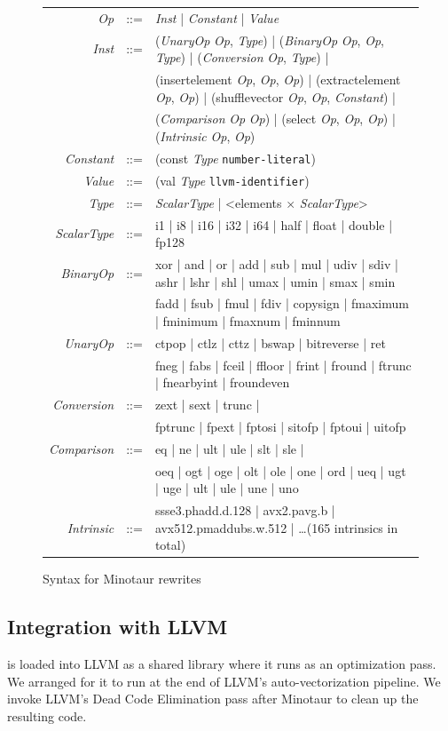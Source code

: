 \begin{figure}[tbp]
  \begin{tabular}{r c l}
    \emph{Op} &::=& \emph{Inst} | \emph{Constant} | \emph{Value} \\
    \emph{Inst}  &::=& (\emph{UnaryOp} \emph{Op}, \emph{Type}) | (\emph{BinaryOp} \emph{Op}, \emph{Op}, \emph{Type}) | (\emph{Conversion} \emph{Op}, \emph{Type}) |\\
              && (insertelement \emph{Op}, \emph{Op}, \emph{Op}) | (extractelement \emph{Op}, \emph{Op}) | (shufflevector \emph{Op}, \emph{Op}, \emph{Constant}) |\\
              && (\emph{Comparison} \emph{Op} \emph{Op}) | (select \emph{Op}, \emph{Op}, \emph{Op}) | (\emph{Intrinsic} \emph{Op}, \emph{Op}) \\
    \emph{Constant} &::=& (const \emph{Type} \texttt{number-literal}) \\
    \emph{Value} &::=& (val \emph{Type} \texttt{llvm-identifier}) \\

    \emph{Type} &::=& \emph{ScalarType} | <elements $\times$ \emph{ScalarType}> \\
    \emph{ScalarType} &::=& i1 | i8 | i16 | i32 | i64 | half | float | double | fp128 \\
    \emph{BinaryOp} &::=& xor | and | or | add | sub | mul | udiv | sdiv | ashr | lshr | shl | umax | umin | smax | smin\\
                && fadd | fsub | fmul | fdiv | copysign | fmaximum | fminimum | fmaxnum | fminnum \\
    \emph{UnaryOp} &::=& ctpop | ctlz | cttz | bswap | bitreverse | ret\\
                      && fneg | fabs | fceil | ffloor | frint | fround | ftrunc | fnearbyint | froundeven \\
    \emph{Conversion} &::=& zext | sext | trunc |\\
                    && fptrunc | fpext | fptosi | sitofp | fptoui | uitofp \\
    \emph{Comparison} &::=& eq | ne | ult | ule | slt | sle |\\
                && oeq | ogt | oge | olt | ole | one | ord | ueq | ugt | uge | ult | ule | une | uno \\
    \emph{Intrinsic} &::=& ssse3.phadd.d.128 | avx2.pavg.b | avx512.pmaddubs.w.512 | \dots (165 intrinsics in total) \\
  \end{tabular}
  \caption{Syntax for Minotaur rewrites}
  \label{fig:syntax}
\end{figure}



\subsection{Integration with LLVM}

\minotaur{} is loaded into LLVM as a shared library where it runs as an
optimization pass.
%
We arranged for it to run at the end of LLVM's auto-vectorization pipeline.
%
We invoke LLVM's Dead Code Elimination pass after Minotaur to
clean up the resulting code.
